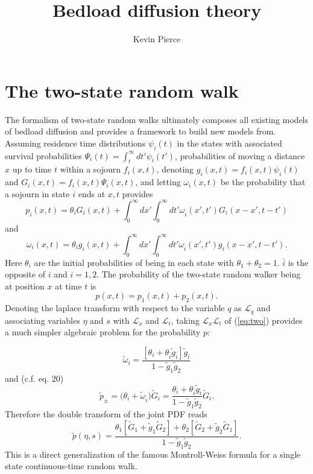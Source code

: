 \documentclass[11pt]{article}
\newcommand\be{\begin{equation}} %
\newcommand\ee{\end{equation}}   %
\newcommand\El{\mathcal{L}}
\begin{document}
\title{Bedload diffusion theory}
\author{Kevin Pierce}
\maketitle

\section{The two-state random walk}
The formalism of two-state random walks \citep[e.g.][]{Weiss1976,Weiss1994,Masoliver2016,Masoliver2017} ultimately composes all existing models of bedload diffusion \citep[e.g.][]{Nikora2001a,Nikora2002,Zhang2012,Fan2016} and provides a framework to build new models from.
Assuming residence time distributions $\psi_i(t)$ in the states with associated survival probabilities $\Psi_i(t) = \int_t^\infty dt' \psi_i(t')$, probabilities of moving a distance $x$ up to time $t$ within a sojourn $f_i(x,t)$, denoting $g_i(x,t) =f_i(x,t)\psi_i(t)$ and $G_i(x,t) = f_i(x,t)\Psi_i(x,t)$, and letting $\omega_i(x,t)$ be the probability that a sojourn in state $i$ ends at $x,t$ provides
\be  p_i(x,t) = \theta_i G_i(x,t) + \int_0^\infty dx' \int_0^\infty dt' \omega_{\bar{i}}(x',t')G_i(x-x',t-t')\ee
and 
\be \omega_i(x,t) = \theta_i g_i(x,t) + \int_0^\infty dx' \int_0^\infty dt' \omega_{\bar{i}}(x',t')g_i(x-x',t-t').\label{eq:two}\ee
Here $\theta_i$ are the initial probabilities of being in each state with $\theta_1 + \theta_2=1.$ $\bar{i}$ is the opposite of $i$ and $i=1,2$.
The probability of the two-state random walker being at position $x$ at time $t$ is 
\be p(x,t) = p_1(x,t)+p_2(x,t).\ee
Denoting the laplace transform with respect to the variable $q$ as $\El_q$ and associating variables $\eta$ and $s$ with $\El_x$ and $\El_t$, 
taking $\El_x \El_t$ of (\ref{eq:two}) provides a much simpler algebraic problem for the probability $p$:

\be
\tilde{\omega}_i = 
\frac{[\theta_i+ \theta_{\bar{i}} \tilde{g}_{\bar{i}}]\tilde{g}_i}{1-\tilde{g}_1\tilde{g}_2}
\ee
and (c.f. \citet{Masoliver2016} eq. 20)
\be
\tilde{p}_\pm = \Big( \theta_i + \tilde{\omega}_{\bar{i}} \Big)\tilde{G}_i = \frac{\theta_i + \theta_{\bar{i}} \tilde{g}_{\bar{i}}}{1- \tilde{g}_1\tilde{g}_2}\tilde{G}_i.
\ee
Therefore the double transform of the joint PDF reads \citep[c.f.][eq. 6.33 pg. 243]{Weiss1994}
\be
\tilde{p}(\eta,s) = \frac{\theta_1[\tilde{G}_1 + \tilde{g}_1 \tilde{G}_2] + \theta_2[\tilde{G}_2 + \tilde{g}_2 \tilde{G}_1]}{1-\tilde{g}_1 \tilde{g}_2}.
\label{eq:mw}\ee
This is a direct generalization of the famous Montroll-Weiss formula for a single state continuous-time random walk.
\end{document}
